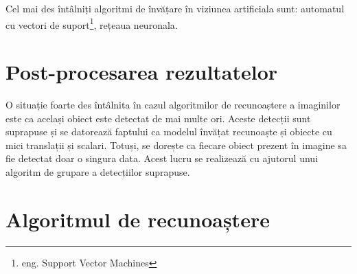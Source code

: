 Cel mai des întâlniți algoritmi de învățare în viziunea artificiala sunt: automatul cu vectori de suport\footnote{eng. Support Vector Machines}, rețeaua neuronala.






\pagebreak
\section{Post-procesarea rezultatelor}

O situație foarte des întâlnita în cazul algoritmilor de recunoaștere a imaginilor este ca același obiect este detectat de mai multe ori.
Aceste detecții sunt suprapuse și se datorează faptului ca modelul învățat recunoaște și obiecte cu mici translații și scalari.
Totuși, se dorește ca fiecare obiect prezent în imagine sa fie detectat doar o singura data.
Acest lucru se realizează cu ajutorul unui algoritm de grupare a detecțiilor suprapuse.

\pagebreak
\section{Algoritmul de recunoaștere}





















